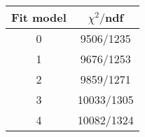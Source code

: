 \begin{tabular}{c|c}
Fit model & $\chi^2/$ndf \\
\hline
0 & 9506/1235\\
1 & 9676/1253\\
2 & 9859/1271\\
3 & 10033/1305\\
4 & 10082/1324\\
\end{tabular}
